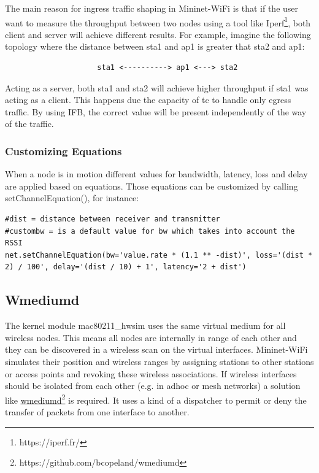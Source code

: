 The main reason for ingress traffic shaping in Mininet-WiFi is that if the user want to measure the throughput between two nodes using a tool like Iperf\footnote{https://iperf.fr/}, both client and server will achieve different results. For example, imagine the following topology where the distance between sta1 and ap1 is greater that sta2 and ap1:

\begin{verbatim}
                     sta1 <----------> ap1 <---> sta2
\end{verbatim}

Acting as a server, both sta1 and sta2 will achieve higher throughput if sta1 was acting as a client. This happens due the capacity of tc to handle only egress traffic. By using IFB, the correct value will be present independently of the way of the traffic.

\subsubsection{Customizing Equations}
When a node is in motion different values for bandwidth, latency, loss and delay are applied based on equations. Those equations can be customized by calling setChannelEquation(), for instance:

\begin{verbatim}
#dist = distance between receiver and transmitter
#custombw = is a default value for bw which takes into account the RSSI
net.setChannelEquation(bw='value.rate * (1.1 ** -dist)', loss='(dist * 2) / 100', delay='(dist / 10) + 1', latency='2 + dist')
\end{verbatim}
             

\subsection{Wmediumd}\label{wmediumd}
The kernel module mac80211\_hwsim uses the same virtual medium for all wireless nodes. This means all nodes are internally in range of each other and they can be discovered in a wireless scan on the virtual interfaces. Mininet-WiFi simulates their position and wireless ranges by assigning stations to other stations or access points and revoking these wireless associations. If wireless interfaces should be isolated from each other (e.g. in adhoc or mesh networks) a solution like \underline{\href{https://github.com/bcopeland/wmediumd}{wmediumd}}\footnote{https://github.com/bcopeland/wmediumd} is required. It uses a kind of a dispatcher to permit or deny the transfer of packets from one interface to another.

